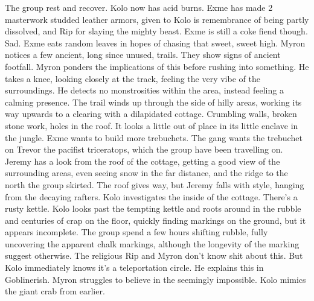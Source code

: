 The group rest and recover. Kolo now has acid burns. Exme has made 2 masterwork studded leather armors, given to Kolo is remembrance of being partly dissolved, and Rip for slaying the mighty beast. Exme is still a coke fiend though. Sad. Exme eats random leaves in hopes of chasing that sweet, sweet high. Myron notices a few ancient, long since unused, trails. They show signs of ancient footfall. Myron ponders the implications of this before rushing into something. He takes a knee, looking closely at the track, feeling the very vibe of the surroundings. He detects no monstrosities within the area, instead feeling a calming presence. The trail winds up through the side of hilly areas, working its way upwards to a clearing with a dilapidated cottage. Crumbling walls, broken stone work, holes in the roof. It looks a little out of place in its little enclave in the jungle. Exme wants to build more trebuchets. The gang wants the trebuchet on Trevor the pacifist triceratops, which the group have been travelling on. Jeremy has a look from the roof of the cottage, getting a good view of the surrounding areas, even seeing snow in the far distance, and the ridge to the north the group skirted. The roof gives way, but Jeremy falls with style, hanging from the decaying rafters. Kolo investigates the inside of the cottage. There’s a rusty kettle. Kolo looks past the tempting kettle and roots around in the rubble and centuries of crap on the floor, quickly finding markings on the ground, but it appears incomplete. The group spend a few hours shifting rubble, fully uncovering the apparent chalk markings, although the longevity of the marking suggest otherwise. The religious Rip and Myron don’t know shit about this. But Kolo immediately knows it’s a teleportation circle. He explains this in Goblinerish. Myron struggles to believe in the seemingly impossible. Kolo mimics the giant crab from earlier.\medskip


